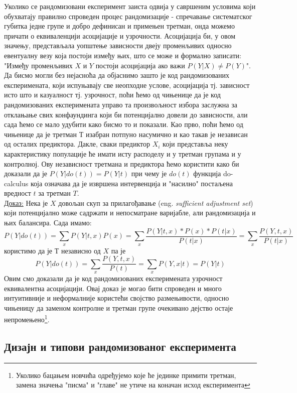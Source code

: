 \documentclass[12pt, a4paper]{article}
\begin{document}
Уколико се рандомизовани експеримент заиста одвија у савршеним условима који обухватају правилно 
спроведен процес рандомизације - спречавање систематског губитка једне групе и добро дефинисан и 
примењен третман, онда можемо причати о еквиваленцији асоцијације и узрочности.
Асоцијација би, у овом значењу, представљала уопштење зависности двеју променљивих односно 
евентуалну везу која постоји између њих, што се може и формално записати: "Између променљивих 
$X$ и $Y$ постоји асоцијација ако важи $P(Y|X) \neq P(Y)$".
Да бисмо могли без нејасноћа да објаснимо зашто је код рандомизованих експеримената, који 
испуњавају све неопходне услове, асоцијација тј. зависност исто што и казуалност тј. узрочност, 
поћи ћемо од чињенице да је код рандомизованих експеримената управо та произвољност избора 
заслужна за отклањање свих конфаундинга који би потенцијално довели до зависности, али сада ћемо 
се мало удубити како бисмо то и показали. Као прво, поћи ћемо од чињенице да је третман $Т$ изабран 
потпуно насумично и као такав је независан од осталих предиктора. Дакле, сваки предиктор $X_i$ 
који представља неку карактеристику популације ће имати исту расподелу и у третман групама и у 
контролној. Ову независност третмана и предиктора ћемо користити како би доказали да је 
$P(Y|do(t)) = P(Y|t)$ при чему је $do(t)$ функција do-calculus која означава да је извршена 
интервенција и "насилно" постаљена вредност $t$ за третман $T$.\\
\underline{Доказ:} Нека је $X$ довољан скуп за прилагођавање (eng. \textit{sufficient adjustment set}) који потенцијално може садржати и непосматране варијабле, али рандомизација и њих балансира.
Сада имамо: 
$$
P(Y|do(t))=\sum_x P(Y|t,x) P(x)=\sum_x \frac{P(Y|t,x)*P(x)*P(t|x)}{P(t|x)}=
\sum_x \frac{P(Y,t,x)}{P(t|x)}
$$ 
користимо да је $Т$ независно од $X$ па је 
$$
P(Y|do(t))=\sum_x \frac{P(Y,t,x)}{P(t)}=\sum_x P(Y,x|t)=P(Y|t)
$$
Овим смо доказали да је код рандомизованих експеримената узрочност еквивалентна асоцијацији.
Овај доказ је могао бити спроведен и много интуитивније и неформалније користећи својство 
размењивости, односно чињеницу да заменом контролне и третман групе очекивано дејство остаје 
непромењено\footnote{Уколико бацањем новчића одређујемо које ће јединке примити третман, замена значења 
"писма" и "главе" не утиче на коначан исход експеримента}.

\subsection{Дизајн и типови рандомизованог експеримента}
\end{document}
